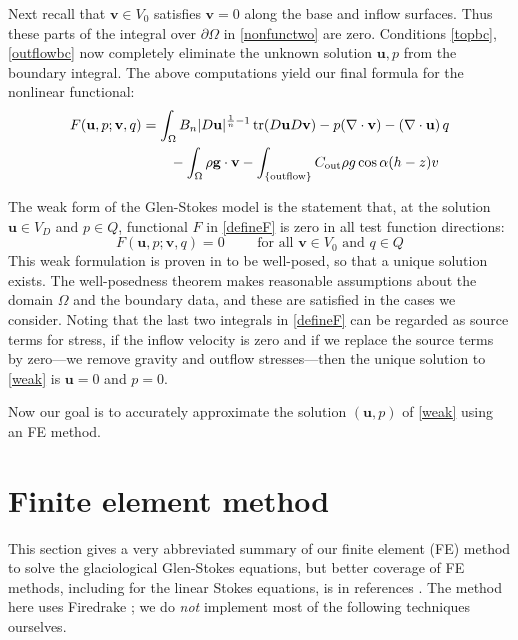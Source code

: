 \documentclass[letterpaper,final,12pt,reqno]{amsart}
\newcommand{\trace}{\operatorname{tr}}
\newcommand{\bu}{\mathbf{u}}
\newcommand{\bv}{\mathbf{v}}
\begin{document}
Next recall that $\bv\in V_0$ satisfies $\bv=0$ along the base and inflow surfaces.  Thus these parts of the integral over $\partial\Omega$ in \eqref{nonfunctwo} are zero.  Conditions \eqref{topbc}, \eqref{outflowbc} now completely eliminate the unknown solution $\bu,p$ from the boundary integral.  The above computations yield our final formula for the nonlinear functional:
\begin{align}
F(\bu,p;\bv,q) &= \int_\Omega B_n |D\bu|^{\frac{1}{n} - 1} \trace(D\bu D\bv) - p (\nabla \cdot \bv) - \left(\nabla \cdot \bu\right) q \label{defineF} \\
    &\qquad  - \int_\Omega \rho \mathbf{g} \cdot \bv - \int_{\{\text{outflow}\}} C_{\text{out}} \rho g \cos\alpha (h-z) v  \notag
\end{align}

The weak form of the Glen-Stokes model is the statement that, at the solution $\bu\in V_D$ and $p\in Q$, functional $F$ in \eqref{defineF} is zero in all test function directions:
\begin{equation}
F(\bu,p;\bv,q) = 0 \qquad \text{ for all } \bv\in V_0 \text{ and } q\in Q  \label{weak}
\end{equation}
This weak formulation is proven in \cite[Theorem 3.8]{JouvetRappaz2011} to be well-posed, so that a unique solution exists.  The well-posedness theorem makes reasonable assumptions about the domain $\Omega$ and the boundary data, and these are satisfied in the cases we consider.  Noting that the last two integrals in \eqref{defineF} can be regarded as source terms for stress, if the inflow velocity is zero and if we replace the source terms by zero---we remove gravity and outflow stresses---then the unique solution to \eqref{weak} is $\bu=0$ and $p=0$.

Now our goal is to accurately approximate the solution $(\bu,p)$ of \eqref{weak} using an FE method.


\section{Finite element method} \label{sec:femethod}

This section gives a very abbreviated summary of our finite element (FE) method to solve the glaciological Glen-Stokes equations, but better coverage of FE methods, including for the linear Stokes equations, is in references \cite{Braess2007,Bueler2021,Elmanetal2014}.  The method here uses Firedrake \cite{Rathgeberetal2016}; we do \emph{not} implement most of the following techniques ourselves.
\end{document}
